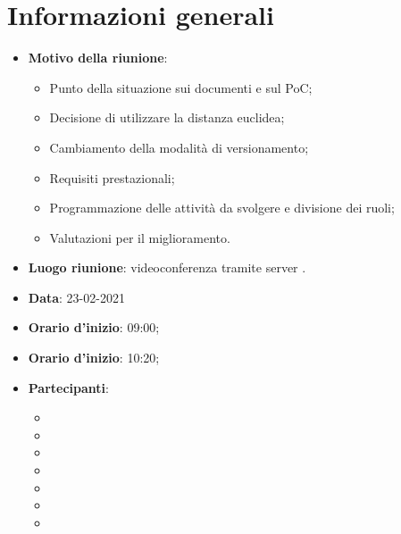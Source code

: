 \section{Informazioni generali}
\begin{itemize}
\item \textbf{Motivo della riunione}: 
\begin{itemize}
\item Punto della situazione sui documenti e sul PoC;
\item Decisione di utilizzare la distanza euclidea;
\item Cambiamento della modalità di versionamento;
\item Requisiti prestazionali;
\item Programmazione delle attività da svolgere e divisione dei ruoli;
\item Valutazioni per il miglioramento.
\end{itemize}
\item \textbf{Luogo riunione}: videoconferenza tramite server .
\item \textbf{Data}: 23-02-2021
\item \textbf{Orario d'inizio}: 09:00;
\item \textbf{Orario d'inizio}: 10:20;
\item \textbf{Partecipanti}:
	\begin{itemize}
	\item \BM{}
	\item \SG{}
	\item \SP{}
	\item \SH{}
	\item \PA{}
	\item \ZM{}
	\item \RA{}
	\end{itemize}
\end{itemize}

\newpage
